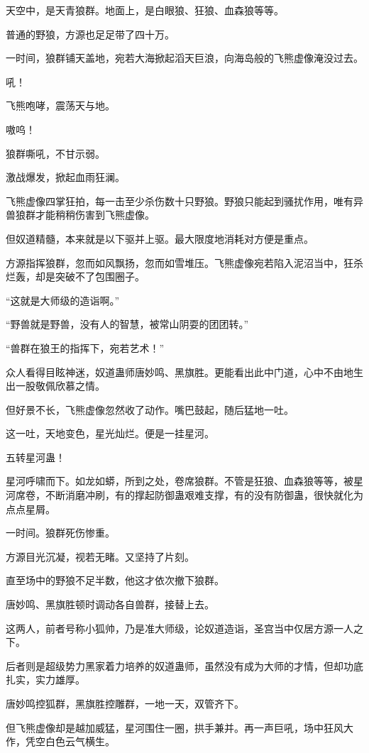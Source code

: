 \begin{this_body}
天空中，是天青狼群。地面上，是白眼狼、狂狼、血森狼等等。

普通的野狼，方源也足足带了四十万。

一时间，狼群铺天盖地，宛若大海掀起滔天巨浪，向海岛般的飞熊虚像淹没过去。

吼！

飞熊咆哮，震荡天与地。

嗷呜！

狼群嘶吼，不甘示弱。

激战爆发，掀起血雨狂澜。

飞熊虚像四掌狂拍，每一击至少杀伤数十只野狼。野狼只能起到骚扰作用，唯有异兽狼群才能稍稍伤害到飞熊虚像。

但奴道精髓，本来就是以下驱并上驱。最大限度地消耗对方便是重点。

方源指挥狼群，忽而如风飘扬，忽而如雪堆压。飞熊虚像宛若陷入泥沼当中，狂杀烂轰，却是突破不了包围圈子。

“这就是大师级的造诣啊。”

“野兽就是野兽，没有人的智慧，被常山阴耍的团团转。”

“兽群在狼王的指挥下，宛若艺术！”

众人看得目眩神迷，奴道蛊师唐妙鸣、黑旗胜。更能看出此中门道，心中不由地生出一股敬佩欣慕之情。

但好景不长，飞熊虚像忽然收了动作。嘴巴鼓起，随后猛地一吐。

这一吐，天地变色，星光灿烂。便是一挂星河。

五转星河蛊！

星河呼啸而下。如龙如蟒，所到之处，卷席狼群。不管是狂狼、血森狼等等，被星河席卷，不断消磨冲刷，有的撑起防御蛊艰难支撑，有的没有防御蛊，很快就化为点点星屑。

一时间。狼群死伤惨重。

方源目光沉凝，视若无睹。又坚持了片刻。

直至场中的野狼不足半数，他这才依次撤下狼群。

唐妙鸣、黑旗胜顿时调动各自兽群，接替上去。

这两人，前者号称小狐帅，乃是准大师级，论奴道造诣，圣宫当中仅居方源一人之下。

后者则是超级势力黑家着力培养的奴道蛊师，虽然没有成为大师的才情，但却功底扎实，实力雄厚。

唐妙鸣控狐群，黑旗胜控雕群，一地一天，双管齐下。

但飞熊虚像却是越加威猛，星河围住一圈，拱手兼并。再一声巨吼，场中狂风大作，凭空白色云气横生。


\end{this_body}
